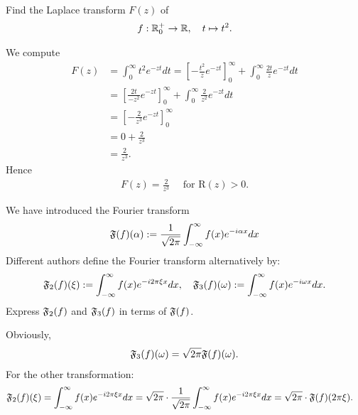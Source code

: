 \documentclass[11pt]{article}
\begin{document}
\begin{exercise}
    Find the Laplace transform $F(z)$ of 
    \begin{align*}
        f : \mathbb{R}_{0}^{+} \to \mathbb{R}, \quad t \mapsto t^{2}.
    \end{align*}
\end{exercise}
\begin{solution}     
We compute 
\begin{align*}
    F(z)&=\int_0^{\infty} t^2 e^{-z t} d t=\left[-\frac{t^2}{z} e^{-z t}\right]_0^{\infty}+\int_0^{\infty} \frac{2 t}{z} e^{-z t} d t \\ &=\left[\frac{2 t}{-z^2} e^{-z t}\right]_0^{\infty}+\int_0^{\infty} \frac{2}{z^2} e^{-z t} d t \\ &=\left[-\frac{2}{z^3} e^{-z t}\right]_0^{\infty} \\ &=0+\frac{2}{z^3} \\ &=\frac{2}{z^3}
    .
\end{align*}
Hence 
\begin{align*}
    F(z)=\frac{2}{z^3} \quad \text { for } \mathrm{R}(z)>0.
\end{align*}
\end{solution}

\begin{exercise}[Extra]
    We have introduced the Fourier transform 
    \begin{align*}
        \mathfrak{F}(f)(\alpha) := \frac{1}{\sqrt{2\pi}}\int_{-\infty}^{\infty} f(x) e^{-i \alpha x} dx
    \end{align*}
    Different authors define the Fourier transform alternatively by:
    \begin{align*}
        \mathfrak{F}_2(f)(\xi) 
        := \int_{-\infty}^{\infty} f(x) e^{-i 2\pi \xi x} dx
        ,
        \quad 
        \mathfrak{F}_3(f)(\omega) 
        := \int_{-\infty}^{\infty} f(x) e^{-i \omega x} dx
        .
    \end{align*}
    Express $\mathfrak{F}_{2}(f)$ and $\mathfrak{F}_{3}(f)$ in terms of $\mathfrak{F}(f)$.
\end{exercise}
\begin{solution}    
    Obviously, 
    \begin{align*}
        \mathfrak{F}_{3}(f)(\omega) = \sqrt{2\pi} \mathfrak{F}(f)(\omega).
    \end{align*}
    For the other transformation:
    \begin{align*}
        \mathfrak{F}_2(f)(\xi) 
        &
        = 
        \int_{-\infty}^{\infty} f(x) e^{-i 2\pi \xi x} dx
        = 
        \sqrt{2\pi} 
        \cdot 
        \frac{1}{\sqrt{2\pi}}
        \int_{-\infty}^{\infty} f(x) e^{-i 2\pi \xi x} dx
        = 
        \sqrt{2\pi} 
        \cdot 
        \mathfrak{F}(f)( 2\pi \xi )
        .
    \end{align*}
\end{solution}
\end{document}

